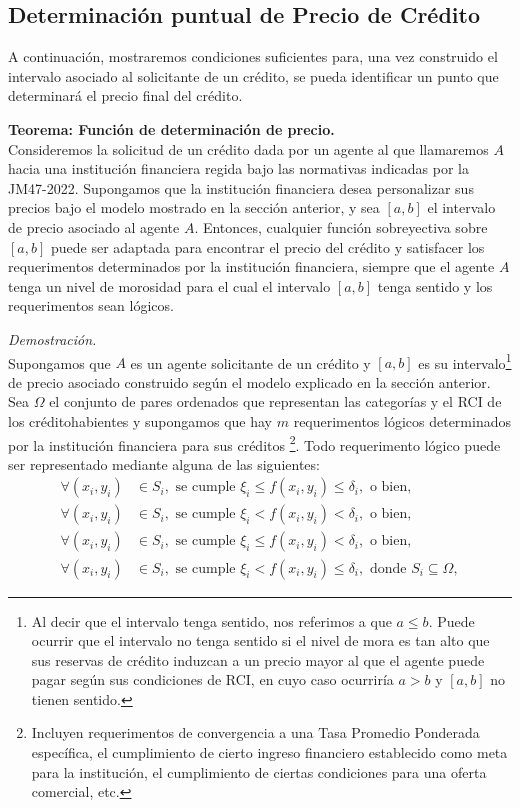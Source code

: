 \subsection{Determinación puntual de Precio de Crédito}
A continuación, mostraremos condiciones suficientes para, una vez construido el intervalo asociado al solicitante de un crédito, se pueda identificar un punto que determinará el precio final del crédito. \\
\begin{mdframed}[linewidth=1pt,linecolor=black] 
\textbf{Teorema: Función de determinación de precio.} \\
Consideremos la solicitud de un crédito dada por un agente al que llamaremos $A$ hacia una institución financiera regida bajo las normativas indicadas por la JM47-2022. Supongamos que la institución financiera desea personalizar sus precios bajo el modelo mostrado en la sección anterior, y sea $[a,b]$ el intervalo de precio asociado al agente $A$. Entonces, cualquier función sobreyectiva sobre $[a,b]$ puede ser adaptada para encontrar el precio del crédito y satisfacer los requerimentos determinados por la institución financiera, siempre que el agente $A$ tenga un nivel de morosidad para el cual el intervalo $[a,b]$ tenga sentido  y los requerimentos sean lógicos.
\end{mdframed} 
\textit{Demostración.} \\
Supongamos que $A$ es un agente solicitante de un crédito y $[a,b]$ es su intervalo\footnote{Al decir que el intervalo tenga sentido, nos referimos a que $a\leq b$. Puede ocurrir que el intervalo no tenga sentido si el nivel de mora es tan alto que sus reservas de crédito induzcan a un precio mayor al que el agente puede pagar según sus condiciones de RCI, en cuyo caso ocurriría $a>b$ y $[a,b]$ no tienen sentido.} de precio asociado construido según el modelo explicado en la sección anterior. Sea $\Omega$ el conjunto de pares ordenados que representan las categorías y el RCI de los créditohabientes y supongamos que hay $m$ requerimentos lógicos determinados por la institución financiera para sus créditos \footnote{Incluyen requerimentos de convergencia a una Tasa Promedio Ponderada específica, el cumplimiento de cierto ingreso financiero establecido como meta para la institución, el cumplimiento de ciertas condiciones para una oferta comercial, etc.}. Todo requerimento lógico puede ser representado mediante alguna de las siguientes: 
\begin{align*}
    \forall (x_i,y_i) &\in S_i, \text{ se cumple } \xi_i \leq f(x_i, y_i) \leq \delta_i, \text{ o bien,}\\
    \forall (x_i,y_i) &\in S_i, \text{ se cumple } \xi_i < f(x_i, y_i) < \delta_i, \text{ o bien,} \\
    \forall (x_i,y_i) &\in S_i, \text{ se cumple } \xi_i \leq f(x_i, y_i) < \delta_i, \text{ o bien,} \\ 
    \forall (x_i,y_i) &\in S_i, \text{ se cumple } \xi_i < f(x_i, y_i) \leq \delta_i, \text{ donde } S_i \subseteq \Omega, 
\end{align*}
